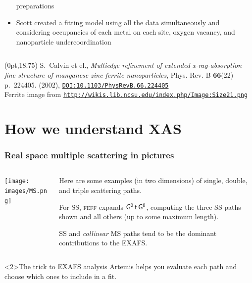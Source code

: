 \documentclass[10pt, xcolor=x11names, compress]{beamer}
\begin{document}
\begin{frame}
\begin{columns}[T]
\begin{column}{0.5\linewidth}
\begin{itemize}
        preparations
      \item Scott created a fitting model using all the data
        simultaneously and considering occupancies of each metal on
        each site, oxygen vacancy, and nanoparticle undercoordination
      \end{itemize}
    \end{column}
  \end{columns}
  \begin{textblock*}{0.7\linewidth}(0pt,18.75\TPVertModule)%
    \tiny%
    S.\ Calvin et el., \textit{Multiedge refinement of extended
      x-ray-absorption fine structure of manganese zinc ferrite
      nanoparticles}, Phys. Rev. B \textbf{66}(22) p.~224405. (2002),
    \href{http://dx.doi.org/10.1103/PhysRevB.66.224405}
    {\color{Blue4}\texttt{DOI:10.1103/PhysRevB.66.224405}}\\
    Ferrite image from
    \href{http://wikis.lib.ncsu.edu/index.php/Image:Size21.png}
    {\color{Blue4}\texttt{http://wikis.lib.ncsu.edu/index.php/Image:Size21.png}}
  \end{textblock*}
\end{frame}

\section{How we understand XAS}




\begin{frame}
  \frametitle{Real space multiple scattering in pictures}
  \begin{columns}[T]
    \begin{column}{0.5\linewidth}
      \texttt{[image: images/MS.png]}
    \end{column}
    \begin{column}{0.5\linewidth}
      Here are some examples (in two dimensions) of single, double,
      and triple scattering paths.

      \medskip

      For SS, \textsc{feff} expands
      {\color{DarkOrchid4}$\mathsf{G^0}\,\mathsf{t}\,\mathsf{G^0}$}, computing the three
      SS paths shown and all others (up to some maximum length).

      \medskip

      SS and \textit{collinear} MS paths tend to be the dominant
      contributions to the EXAFS.
    \end{column}
  \end{columns}
  \begin{exampleblock}<2>{The trick to EXAFS analysis}
    Artemis helps you evaluate each path and choose which ones to
    include in a fit.
  \end{exampleblock}
\end{frame}
\end{document}
